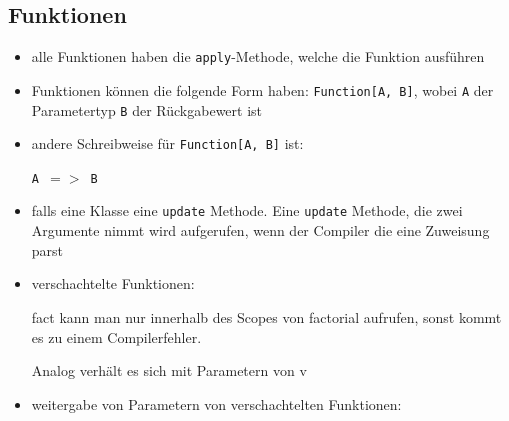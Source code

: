 \subsection{Funktionen}
\begin{itemize}
  \item alle Funktionen haben die \texttt{apply}-Methode, welche die Funktion ausführen
  \item Funktionen können die folgende Form
  haben: \texttt{Function[A, B]}, wobei \texttt{A} der Parametertyp 
  \und \texttt{B} der Rückgabewert ist
  
  
  \item andere Schreibweise für \texttt{Function[A, B]} ist:
  
  \texttt{A $=>$ B}
  
  \item falls eine Klasse eine \texttt{update} Methode. Eine \texttt{update}
  Methode, die zwei  Argumente nimmt wird aufgerufen, wenn der Compiler die
  eine Zuweisung parst
  
  
  \item verschachtelte Funktionen:
  
  
  
  fact kann man nur innerhalb des Scopes von factorial aufrufen, sonst kommt
  es zu einem Compilerfehler.
  
  Analog verhält es sich mit Parametern von v
  \item weitergabe von Parametern von verschachtelten Funktionen:
  
    
\end{itemize}


